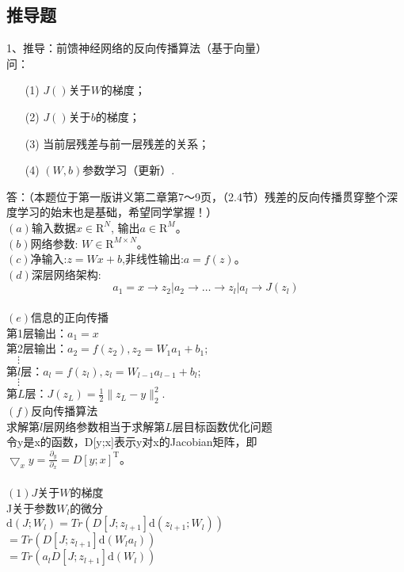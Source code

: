 \documentclass[UFT8]{ctexart}
\begin{document}
\subsection{推导题}
1、推导：前馈神经网络的反向传播算法（基于向量）\\
问：
\begin{itemize}
\item[(1)] $J()$关于$W$的梯度；
\item[(2)] $J()$关于$b$的梯度；
\item[(3)] 当前层残差与前一层残差的关系；
\item[(4)] $(W,b)$参数学习（更新）.
\end{itemize}
答：（本题位于第一版讲义第二章第7～9页，（2.4节）残差的反向传播贯穿整个深度学习的始末也是基础，希望同学掌握！）\\
$(a)$输入数据$x \in \mathrm{R}^{N}$, 输出$a \in \mathrm{R}^{M}$。\\
$(b)$网络参数: $W \in \mathrm{R}^{M \times N}$。 \\
$(c)$净输入:$z = Wx + b$,非线性输出:$a = f(z)$。\\
$(d)$深层网络架构:
\[a_{1} =x \to z_{2}|a_{2} \to \ldots \to z_{l}| a_{l} \to
J(z_{l}) \] \\
$(e)$信息的正向传播\\
第1层输出：$a_{1} = x$\\
第2层输出：$a_{2} = f(z_{2}),z_{2} = W_{1}a_{1} + b_{1}$;\\
$\quad \vdots$\\
第$l$层：$a_{l} = f(z_{l}),z_{l} = W_{l-1}a_{l-1} + b_{l}$;\\
$\quad \vdots$\\
第$L$层：$J(z_{L}) = \frac{1}{2}\big\|z_{L} - y\|_{2}^{2}$.\\
$(f)$反向传播算法 \\
求解第$l$层网络参数相当于求解第$L$层目标函数优化问题\\
令y是x的函数，D[y;x]表示y对x的Jacobian矩阵，即\\
\(\bigtriangledown_{x}y = \frac{\partial_{y}}{\partial_{x}} = D[y;x]^\mathrm{T}\)。\\
~\\
$(1) J$关于$W$的梯度\\
J关于参数$W_{l}$的微分\\
\(\mathrm{d}(J;W_{l})= Tr(D[J;z_{l+1}]\mathrm{d}(z_{l+1};W_{l})) \) \\
\( = Tr(D[J;z_{l+1}]\mathrm{d}(W_{l}a_{l})) \) \\
\( = Tr(a_{l}D[J;z_{l+1}]\mathrm{d}(W_{l})) \) \\
\end{document}
